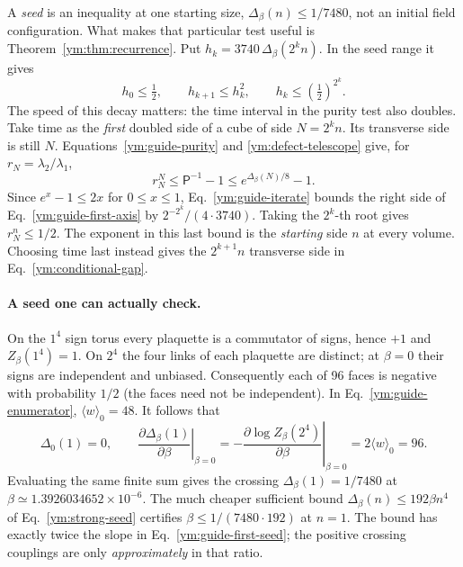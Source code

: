 A \emph{seed} is an inequality at one starting size, $\Delta_\beta(n)\le
1/7480$, not an initial field configuration. What makes that particular
test useful is Theorem~\ref{ym:thm:recurrence}. Put
$h_k=3740\,\Delta_\beta(2^kn)$. In the seed range it gives
\begin{equation}\label{ym:guide-iterate}
 h_0\le\tfrac12,\qquad h_{k+1}\le h_k^2,
 \qquad h_k\le(\tfrac12)^{2^k}.
\end{equation}
The speed of this decay matters: the time interval in the purity test
also doubles. Take time as the \emph{first} doubled side of a cube of side
$N=2^kn$. Its transverse side is still $N$. Equations~\eqref{ym:guide-purity}
and \eqref{ym:defect-telescope} give, for $r_N=\lambda_2/\lambda_1$,
\begin{equation}\label{ym:guide-first-axis}
 r_N^N\le\mathsf P^{-1}-1\le e^{\Delta_\beta(N)/8}-1.
\end{equation}
Since $e^x-1\le2x$ for $0\le x\le1$, Eq.~\eqref{ym:guide-iterate}
bounds the right side of Eq.~\eqref{ym:guide-first-axis} by
$2^{-2^k}/(4\cdot3740)$. Taking the $2^k$-th root gives $r_N^n\le1/2$.
The exponent in this last bound is the \emph{starting} side $n$ at every
volume. Choosing time last instead gives the $2^{k+1}n$ transverse side
in Eq.~\eqref{ym:conditional-gap}.

\paragraph{A seed one can actually check.}
On the $1^4$ sign torus every plaquette is a commutator of signs, hence $+1$
and $Z_\beta(1^4)=1$. On $2^4$ the four links of each plaquette are distinct;
at $\beta=0$ their signs are independent and unbiased. Consequently each of
96 faces is negative with probability $1/2$ (the faces need not be independent).
In Eq.~\eqref{ym:guide-enumerator}, $\langle w\rangle_0=48$. It follows that
\begin{equation}\label{ym:guide-first-seed}
 \Delta_0(1)=0,\qquad
 \left.\frac{\partial\Delta_\beta(1)}{\partial\beta}\right|_{\beta=0}
 =-\left.\frac{\partial\log Z_\beta(2^4)}{\partial\beta}\right|_{\beta=0}
 =2\langle w\rangle_0=96.
\end{equation}
Evaluating the same finite sum gives the crossing $\Delta_\beta(1)=1/7480$
at $\beta\simeq1.3926034652\times10^{-6}$. The much cheaper sufficient
bound $\Delta_\beta(n)\le192\beta n^4$ of Eq.~\eqref{ym:strong-seed}
certifies $\beta\le1/(7480\cdot192)$ at $n=1$. The bound has exactly twice
the slope in Eq.~\eqref{ym:guide-first-seed}; the positive crossing
couplings are only \emph{approximately} in that ratio.

